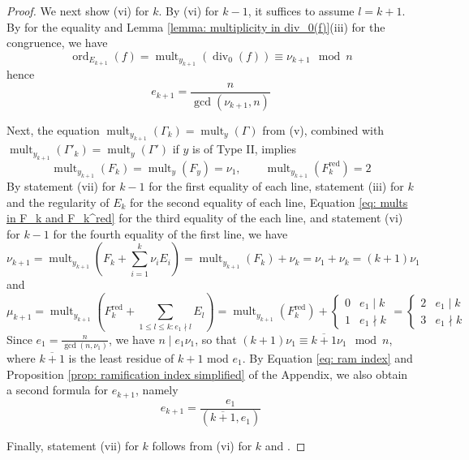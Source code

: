 \documentclass[12pt]{amsart}
\numberwithin{equation}{section}
\theoremstyle{definition}
\renewcommand{\c}[1]{\overline{#1}}
\newcommand{\tx}[1]{\text{#1}}
\DeclareMathOperator{\divi}{div}
\DeclareMathOperator{\red}{red}
\DeclareMathOperator{\mult}{mult}
\DeclareMathOperator{\ord}{ord}
\begin{document}
\begin{proof}
    We next show (vi) for $k$. By (vi) for $k-1$, it suffices to assume $l=k+1$. By \cite[Proposition 9.2.23]{Liu_book} for the equality and Lemma \ref{lemma: multiplicity in div_0(f)}(iii) for the congruence, we have
    \[\ord_{E_{k+1}}(f)=\mult_{y_{k+1}}(\divi_0(f))\equiv \nu_{k+1}\mod n\]
    hence 
    \begin{equation}\label{eq: ram index}
    e_{k+1}=\frac{n}{\gcd(\nu_{k+1},n)}        
    \end{equation}
    
    Next, the equation $\mult_{y_{k+1}}(\Gamma_k)=\mult_y(\Gamma)$ from (v), combined with $\mult_{y_{k+1}}(\Gamma'_k)=\mult_y(\Gamma')$ if $y$ is of Type II, implies
    \begin{equation}\label{eq: mults in F_k and F_k^red}
        \mult_{y_{k+1}}(F_k)=\mult_{y}(F_y)=\nu_1,\quad\quad\mult_{y_{k+1}}(F_k^\tx{red})=2
    \end{equation}
    By statement (vii) for $k-1$ for the first equality of each line, statement (iii) for $k$ and the regularity of $E_k$ for the second equality of each line, Equation \eqref{eq: mults in F_k and F_k^red} for the third equality of the each line, and statement (vi) for $k-1$ for the fourth equality of the first line, we have
    \[\nu_{k+1}=\mult_{y_{k+1}}(F_k+\sum_{i=1}^k\nu_iE_i)=\mult_{y_{k+1}}(F_k)+\nu_k=\nu_1+\nu_k=(k+1)\nu_1\]
    and
    \[\mu_{k+1}=\mult_{y_{k+1}}(F_k^{\red}+\sum_{1\leq l\leq k:e_1\nmid l} E_l)=\mult_{y_{k+1}}(F_k^{\red})+\begin{cases}
        0 & e_1\mid k\\
        1 & e_1\nmid k
    \end{cases}=\begin{cases}
        2 & e_1\mid k\\
        3 & e_1\nmid k
    \end{cases}\]
    Since $e_1=\frac{n}{\gcd(n,\nu_1)}$, we have $n\mid e_1\nu_1$, so that $(k+1)\nu_1\equiv\c{k+1}\nu_1\mod n$, where $\c{k+1}$ is the least residue of $k+1$ mod $e_1$. By Equation \eqref{eq: ram index} and Proposition \ref{prop: ramification index simplified} of the Appendix, we also obtain a second formula for $e_{k+1}$, namely
    \[e_{k+1}=\frac{e_1}{(\c{k+1},e_1)}\]
     
    Finally, statement (vii) for $k$ follows from (vi) for $k$ and \cite[Proposition 9.2.23]{Liu_book}.
\end{proof}
\end{document}
